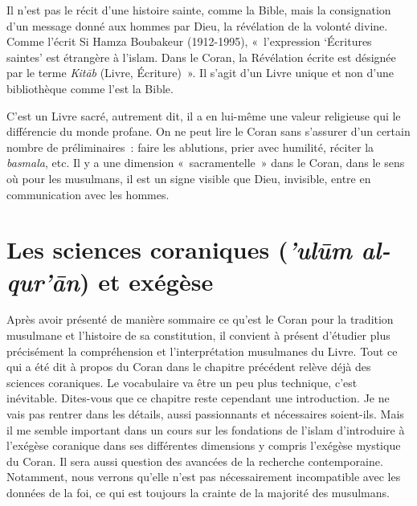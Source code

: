 
Il n'est pas le récit d'une histoire sainte, comme la Bible, mais la
consignation d'un message donné aux hommes par Dieu, la révélation de la
volonté divine. Comme l'écrit Si Hamza Boubakeur (1912-1995),
«~l'expression `Écritures saintes' est étrangère à l'islam. Dans le
Coran, la Révélation écrite est désignée par le terme \emph{Kitāb}
(Livre, Écriture)~». Il s'agit
d'un Livre unique et non d'une bibliothèque comme l'est la Bible.

C'est un Livre sacré, autrement dit, il a en lui-même une valeur
religieuse qui le différencie du monde profane. On ne peut lire le Coran
sans s'assurer d'un certain nombre de préliminaires~: faire les
ablutions, prier avec humilité, réciter la \emph{basmala}, etc. Il y a
une dimension «~sacramentelle~» dans le Coran, dans le sens où pour les
musulmans, il est un signe visible que Dieu, invisible, entre en
communication avec les hommes.

\FloatBarrier
\chapter{Les sciences coraniques (\emph{'ulūm al-qur'ān}) et exégèse}

Après avoir présenté de manière sommaire ce qu'est le Coran pour la
tradition musulmane et l'histoire de sa constitution, il convient à
présent d'étudier plus précisément la compréhension et l'interprétation
musulmanes du Livre. Tout ce qui a été dit à propos du Coran dans le
chapitre précédent relève déjà des sciences coraniques. Le vocabulaire
va être un peu plus technique, c'est inévitable. Dites-vous que ce
chapitre reste cependant une introduction. Je ne vais pas rentrer dans
les détails, aussi passionnants et nécessaires soient-ils. Mais il me
semble important dans un cours sur les fondations de l'islam
d'introduire à l'exégèse coranique dans ses différentes dimensions y
compris l'exégèse mystique du Coran. Il sera aussi question des avancées
de la recherche contemporaine. Notamment, nous verrons qu'elle n'est pas
nécessairement incompatible avec les données de la foi, ce qui est
toujours la crainte de la majorité des musulmans.


